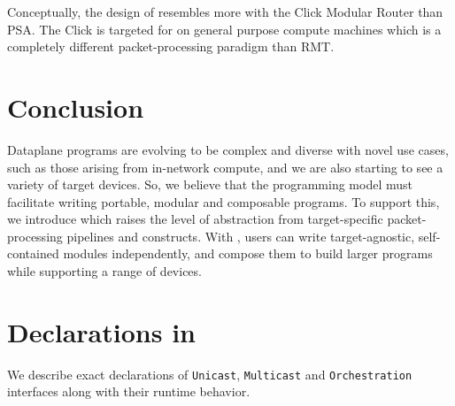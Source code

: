 \documentclass[letterpaper,twocolumn,10pt]{article}
\begin{document}
Conceptually, the design of \uarch resembles more with the Click 
Modular Router\cite{Kohler:2000:CMR:354871.354874} than PSA. The 
Click is targeted for on general purpose compute machines which is a 
completely different packet-processing paradigm than RMT.


\section{Conclusion}
Dataplane programs are evolving to be complex and diverse with novel
use cases, such as those arising from in-network compute, and we are
also starting to see a variety of target devices. So, we believe that
the programming model must facilitate writing portable, modular and
composable programs. To support this, we introduce \ulang which raises
the level of abstraction from target-specific packet-processing
pipelines and constructs. With \ulang, users can write
target-agnostic, self-contained modules independently, and compose
them to build larger programs while supporting a range of devices.



\clearpage




\appendix
\section{Declarations in \uarch}
\label{appendix:section:micro-switch-architecture}
We describe exact declarations of \texttt{Unicast}, 
\texttt{Multicast} and \texttt{Orchestration} interfaces along with 
their runtime behavior. 
\end{document}
